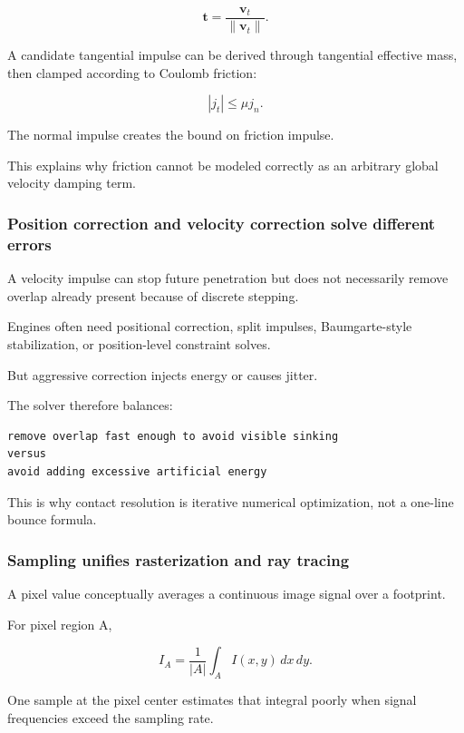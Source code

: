 \[
\mathbf t=
\frac{\mathbf v_t}{\|\mathbf v_t\|}.
\]

A candidate tangential impulse can be derived through tangential effective mass, then clamped according to Coulomb friction:

\[
|j_t|
\le
\mu j_n.
\]

The normal impulse creates the bound on friction impulse.

This explains why friction cannot be modeled correctly as an arbitrary global velocity damping term.

\subsubsection{Position correction and velocity correction solve different errors}\label{03-visual-computing-i-ch001-position-correction-and-velocity-correction-solve-different-errors}

A velocity impulse can stop future penetration but does not necessarily remove overlap already present because of discrete stepping.

Engines often need positional correction, split impulses, Baumgarte-style stabilization, or position-level constraint solves.

But aggressive correction injects energy or causes jitter.

The solver therefore balances:

\begin{verbatim}
remove overlap fast enough to avoid visible sinking
versus
avoid adding excessive artificial energy
\end{verbatim}

This is why contact resolution is iterative numerical optimization, not a one-line bounce formula.

\subsubsection{Sampling unifies rasterization and ray tracing}\label{03-visual-computing-i-ch001-sampling-unifies-rasterization-and-ray-tracing}

A pixel value conceptually averages a continuous image signal over a footprint.

For pixel region A,

\[
I_A
=
\frac{1}{|A|}
\int_A I(x,y)\,dx\,dy.
\]

One sample at the pixel center estimates that integral poorly when signal frequencies exceed the sampling rate.


